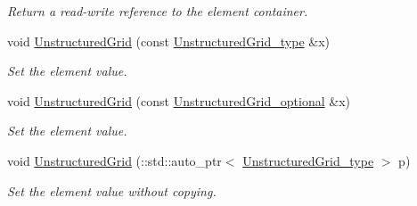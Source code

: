 \begin{DoxyCompactItemize}
\begin{DoxyCompactList}\small\item\em Return a read-\/write reference to the element container. \end{DoxyCompactList}\item 
void \hyperlink{classVTKFile__t_a2c2b1b2ff487c7e61bcd2875db8747be}{Unstructured\+Grid} (const \hyperlink{classVTKFile__t_a34ea02f6804e701657f11a8dc3851951}{Unstructured\+Grid\+\_\+type} \&x)
\begin{DoxyCompactList}\small\item\em Set the element value. \end{DoxyCompactList}\item 
void \hyperlink{classVTKFile__t_ae33d9781bddb747f9255570b1af2dfeb}{Unstructured\+Grid} (const \hyperlink{classVTKFile__t_ada5bb5a706e03ef1ab2ed1513ea83833}{Unstructured\+Grid\+\_\+optional} \&x)
\begin{DoxyCompactList}\small\item\em Set the element value. \end{DoxyCompactList}\item 
void \hyperlink{classVTKFile__t_af19a966f55acb5f03299af922bd9dd75}{Unstructured\+Grid} (\+::std\+::auto\+\_\+ptr$<$ \hyperlink{classVTKFile__t_a34ea02f6804e701657f11a8dc3851951}{Unstructured\+Grid\+\_\+type} $>$ p)
\begin{DoxyCompactList}\small\item\em Set the element value without copying. \end{DoxyCompactList}\end{DoxyCompactItemize}
